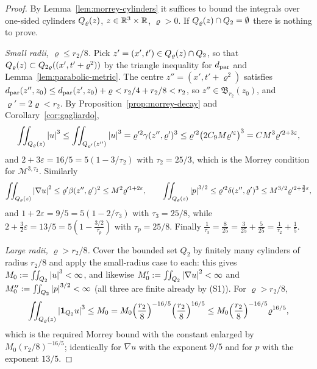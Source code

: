 \documentclass[11pt,reqno]{amsart}
\begin{document}
\begin{proof}
By Lemma~\ref{lem:morrey-cylinders} it suffices to bound the integrals over
one-sided cylinders $Q_{\varrho}(z)$, $z\in\mathbb{R}^{3}\times\mathbb{R}$, $\varrho>0$. If
$Q_{\varrho}(z)\cap Q_{2}=\emptyset$ there is nothing to prove.

\emph{Small radii, $\varrho\le r_{2}/8$.} Pick
$z'=(x',t')\in Q_{\varrho}(z)\cap Q_{2}$, so that
$Q_{\varrho}(z)\subset Q_{2\varrho}((x',t'+\varrho^{2}))$ by the triangle
inequality for $d_{\mathrm{par}}$ and Lemma~\ref{lem:parabolic-metric}. The centre
$z''=(x',t'+\varrho^{2})$ satisfies
$d_{\mathrm{par}}(z'',z_{0})\le d_{\mathrm{par}}(z',z_{0})+\varrho<r_{2}/4+r_{2}/8<r_{2}$, so
$z''\in\mathfrak{B}_{r_{2}}(z_{0})$, and $\varrho'=2\varrho<r_{2}$. By Proposition~\ref{prop:morrey-decay} and
Corollary~\ref{cor:gagliardo},
\[
  \iint_{Q_{\varrho}(z)}\left\lvert u \right\rvert^{3}
  \le\iint_{Q_{\varrho'}(z'')}\left\lvert u \right\rvert^{3}
  =\varrho'^{2}\gamma(z'',\varrho')^{3}
  \le\varrho'^{2}\bigl(2C_{9}M\varrho'^{\varepsilon}\bigr)^{3}
  =C M^{3}\varrho'^{2+3\varepsilon},
\]
and $2+3\varepsilon=16/5=5(1-3/\tau_{2})$ with $\tau_{2}=25/3$, which is the
Morrey condition for $\mathcal{M}^{3,\tau_{2}}$. Similarly
\[
  \iint_{Q_{\varrho}(z)}\left\lvert \nabla u \right\rvert^{2}\le\varrho'\beta(z'',\varrho')^{2}
  \le M^{2}\varrho'^{1+2\varepsilon},
  \qquad
  \iint_{Q_{\varrho}(z)}\left\lvert p \right\rvert^{3/2}\le\varrho'^{2}\delta(z'',\varrho')^{3}
  \le M^{3/2}\varrho'^{2+\frac32\varepsilon},
\]
and $1+2\varepsilon=9/5=5(1-2/\tau_{3})$ with $\tau_{3}=25/8$, while
$2+\tfrac32\varepsilon=13/5=5(1-\tfrac{3/2}{\tau_{p}})$ with $\tau_{p}=25/8$.
Finally $\tfrac1{\tau_{3}}=\tfrac8{25}=\tfrac3{25}+\tfrac5{25}
 =\tfrac1{\tau_{2}}+\tfrac15$.

\emph{Large radii, $\varrho>r_{2}/8$.} Cover the bounded set $Q_{2}$ by finitely
many cylinders of radius $r_{2}/8$ and apply the small-radius case to each: this
gives $M_{0}:=\iint_{Q_{2}}\left\lvert u \right\rvert^{3}<\infty$, and likewise
$M_{0}':=\iint_{Q_{2}}\left\lvert \nabla u \right\rvert^{2}<\infty$ and
$M_{0}'':=\iint_{Q_{2}}\left\lvert p \right\rvert^{3/2}<\infty$ (all three are finite already by
(S1)). For $\varrho>r_{2}/8$,
\[
  \iint_{Q_{\varrho}(z)}\left\lvert \mathbf{1}_{Q_{2}}u \right\rvert^{3}\le M_{0}
  =M_{0}\Bigl(\frac{r_{2}}8\Bigr)^{-16/5}\Bigl(\frac{r_{2}}8\Bigr)^{16/5}
  \le M_{0}\Bigl(\frac{r_{2}}8\Bigr)^{-16/5}\varrho^{16/5},
\]
which is the required Morrey bound with the constant enlarged by
$M_{0}(r_{2}/8)^{-16/5}$; identically for $\nabla u$ with the exponent $9/5$ and
for $p$ with the exponent $13/5$.
\end{proof}
\end{document}
